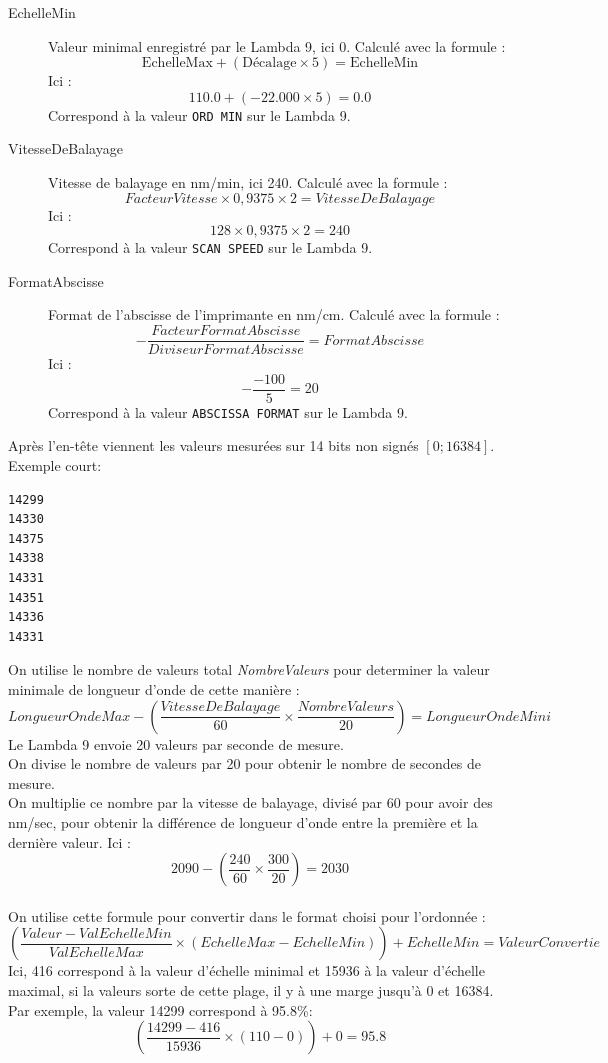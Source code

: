\documentclass[a4paper, 12pt]{article}
\begin{document}
\begin{description}
	\item[EchelleMin] Valeur minimal enregistré par le Lambda 9, ici 0.
		Calculé avec la formule : 
		$$ \text{EchelleMax} + ( \text{Décalage} \times 5 ) = \text{EchelleMin}$$
		Ici :
		$$110.0 + ( -22.000 \times 5 ) = 0.0$$ 
		Correspond à la valeur \verb|ORD MIN| sur le Lambda 9.
	\item[VitesseDeBalayage] Vitesse de balayage en nm/min, ici 240. 
		Calculé avec la formule : 
		$$FacteurVitesse \times 0,9375 \times 2 = VitesseDeBalayage$$
		Ici :
		$$128 \times 0,9375 \times 2 = 240$$ 
		Correspond à la valeur \verb|SCAN SPEED| sur le Lambda 9.

	\item[FormatAbscisse] Format de l'abscisse de l'imprimante en nm/cm. 
		Calculé avec la formule : 
		$$ { - \frac{FacteurFormatAbscisse}{DiviseurFormatAbscisse} } = FormatAbscisse $$ 
		Ici :
		$$ - \frac{-100}{5} = 20$$ 
		Correspond à la valeur \verb|ABSCISSA FORMAT| sur le Lambda 9.


\end{description}

Après l'en-tête viennent les valeurs mesurées sur 14 bits non signés $[0;16384]$. 
Exemple court:  

\begin{lstlisting}
14299
14330
14375
14338
14331
14351
14336
14331
\end{lstlisting}

On utilise le nombre de valeurs total \emph{NombreValeurs} pour determiner la valeur minimale de longueur d'onde de cette manière :
$$ LongueurOndeMax - \left ( \frac{VitesseDeBalayage}{60} \times \frac{NombreValeurs}{20} \right ) = LongueurOndeMini$$
Le Lambda 9 envoie 20 valeurs par seconde de mesure.\\
On divise le nombre de valeurs par 20 pour obtenir le nombre de secondes de mesure.\\
On multiplie ce nombre par la vitesse de balayage, divisé par 60 pour avoir des nm/sec, pour obtenir la différence de longueur d'onde entre la première et la dernière valeur.
Ici :
$$ 2090 - \left ( \frac{240}{60} \times \frac{300}{20} \right ) = 2030 $$ \\


On utilise cette formule pour convertir dans le format choisi pour l'ordonnée :
$$ \left ( \frac{Valeur - ValEchelleMin}{ValEchelleMax} \times (EchelleMax - EchelleMin) \right ) + EchelleMin = ValeurConvertie $$
Ici, 416 correspond à la valeur d'échelle minimal et 15936 à la valeur d'échelle maximal, si la valeurs sorte de cette plage, il y à une marge jusqu'à 0 et 16384.
Par exemple, la valeur 14299 correspond à 95.8\%: 
$$ \left (\frac{14299-416}{15936} \times ( 110 - 0 ) \right ) + 0 = 95.8$$\\
\end{document}
